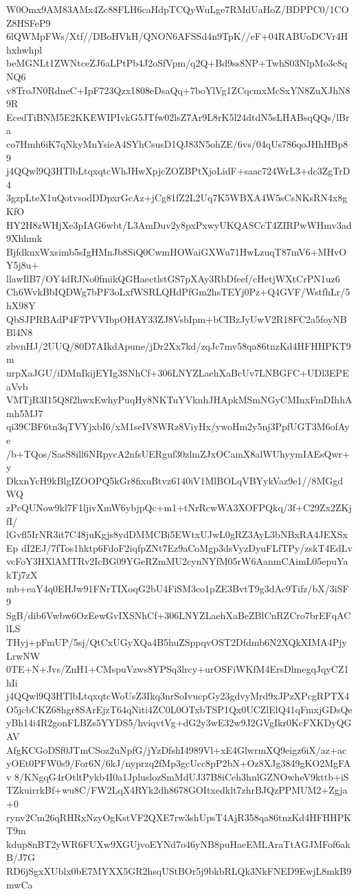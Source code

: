 W0Omx9AM83AMx4Zc88FLH6caHdpTCQyWuLge7RMdUaHoZ/BDPPC0/1COZ8HSFeP9
6lQWMpFWs/Xtf//DBoHVkH/QNON6AFSSd4n9TpK//eF+04RABUoDCVr4Hhxhwhpl
beMGNLt1ZWNtceZJ6aLPtPb4J2oSfVpm/q2Q+Bd9ss8NP+TwhS03NlpMo3c8qNQ6
v8TroJN0RdneC+IpF723Qzx1808eDsaQq+7boYlVg1ZCqcmxMcSxYN8ZuXJhN89R
EcedTiBNM5E2KKEWIPIvkG5JTfw02lsZ7Ar9L8rK5l24dtdN5sLHABsqQQs/lBra
co7Hmh6iK7qNkyMnYsieA4SYhCsusD1QJ83N5ohZE/6vs/04qUs786qoJHhHBp89
j4QQwl9Q3HTlbLtqxqtcWhJHwXpjcZOZBPtXjoLidF+saac724WrL3+dc3ZgTrD4
3gzpLteX1uQotvsodDDpxrGcAz+jCg81fZ2L2Uq7K5WBXA4W5sCsNKsRN4x8gKfO
HY2H8zWHjXe3pIAG6wbt/L3AmDuv2y8pxPxwyUKQASCcT4ZIRPwWHmv3ad9Xhhmk
BjfdknxWxsimb5sIgHMnJb8SiQ0CwmHOWaiGXWu71HwLzuqT87mV6+MHvOY5j8u+
llawIlB7/OY4dRJNo0fmikQGHaectlstGS7pXAy3RbDfeef/cHetjWXtCrPN1uz6
Ch6WvkBbIQDWg7bPF3oLxfWSRLQHdPfGm2hsTEYj0Pz+Q4GVF/WstfhLr/5hX98Y
QbSJPRBAdP4F7PVVIbpOHAY33ZJ8VsbIpm+bCIBzJyUwV2R18FC2a5foyNBBl4N8
zbvnHJ/2UUQ/80D7AIkdApune/jDr2Xx7kd/zqJc7mv58qa86tnzKd4HFHHPKT9m
urpXaJGU/iDMnIkijEYIg3SNhCf+306LNYZLaehXaBcUv7LNBGFC+UDl3EPEaVvb
VMTjR3I15Q8f2hwxEwhyPuqHy8NKTuYVknhJHApkMSmNGyCMInxFmDIhhAmh5MJ7
qi39CBF6tn3qTVYjxbI6/xM1seIV8WRz8ViyHx/ywoHm2y5nj3PpfUGT3M6ofAye
/b+TQos/SasS8ill6NRpycA2nfsUERguf30zlmZJxOCamX8alWUhyymIAEsQwr+y
DkxnYcH9kBlgIZOOPQ5kGr8fixuBtvz6140iV1MlBOLqVBYykVaz9e1//8MGgdWQ
zPcQUNow9kl7F1ljivXmW6ybjpQc+m1+tNrRcwWA3XOFPQkq/3f+C29Zx2ZKjfI/
lGvfl5IrNR3it7C48juKgjs8ydDMMCBi5EWtxUJwL0gRZ3AyL3bNBxRA4JEXSxEp
dI2EJ/7fTos1hktp6FdoF2iqfpZNt7Ez9aCoMgp3dsVyzDyuFLfTPy/zskT4EdLv
vcFoY3HXlAMTRv2IcBG09YGeRZmMU2cynNYfM05rW6AanmCAimL05epuYakTj7zX
mb+eaY4q0EHJw91FNrTIXoqG2bU4FiSM3co1pZE3BvtT9g3dAc9Tifz/bX/3iSF9
SgB/dib6Vwbw6OzEewGvIXSNhCf+306LNYZLaehXaBeZBlCnRZCro7brEFqAClLS
THyj+pFmUP/5sj/QtCxUGyXQa4B5huZSppqvOST2Dfdmb6N2XQkXIMA4PjyLrwNW
0TE+N+Jvs/ZnH1+CMspuVzws8YPSq3lrcy+urOSFiWKfM4ErsDlmegqJqyCZ1hIi
j4QQwl9Q3HTlbLtqxqtcWoUsZ3Ikq3nrSoIvucpGy23gdvyMrd9xJPzXPcgRPTX4
O5jcbCKZ68hgr8SArEjzT64qNiti4ZC0L0OTxbTSP1Qx0UCZlElQ41qFmxjGDsQe
yBh14i4R2gonFLBZs5YYDS5/hviqvtVg+dG2y3wE32w9J2GVgIkr0KcFXKDyQGAV
AfgKCGoDSf0JTmCSoz2uNpfG/jYzDfshI4989Vl+xE4GlwrmXQ9eigz6iX/az+ac
yOEt0PFW0s9/For6N/6kJ/nyprzq2fMp3gcUcc8pP2bN+Oz8XJg3849gKO2MgFAv
8/KNgqG4rOtltPykb4I0a1JpluslozSmMdUJ37B8iCeh3hnlGZNOwheV9kttb+iS
TZkuirrkBf+wu8C/FW2LqX4RYk2dh8678GOItxedklt7zhrBJQzPPMUM2+Zgja+0
rynv2Cm26qRHRxNzyOgKstVF2QXE7rw3shUpsT4AjR358qa86tnzKd4HFHHPKT9m
kdup8nBT2yWR6FUXw9XGUjvoEYNd7o46yNB8puHaeEMLAraTtAGJMFof6akB/J7G
RD6jSgxXUblx0bE7MYXX5GR2hsqUStBOr5j9bkbRLQk3NkFNED9EwjL8mkB9mwCa
